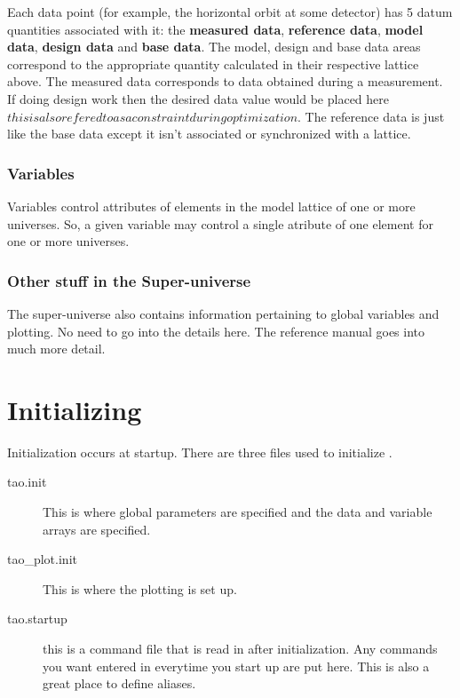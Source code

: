 \documentclass{report}
\begin{document}
Each data point (for example, the horizontal orbit at some detector) has 5 datum
 quantities associated with it: the \textbf{measured data}, \textbf{reference
data}, \textbf{model data}, \textbf{design data} and \textbf{base data}. The
model, design and base data areas correspond to the appropriate quantity
calculated in their respective lattice above. The measured data corresponds to 
data obtained during a measurement. If doing design work then the desired data
value would be placed here \( this is also refered to as a constraint during
optimization\). The reference data is just like the base data except it isn't
associated or synchronized with a lattice.

\subsection{Variables}

Variables control attributes of elements in the model lattice of one or more
universes. So, a given variable may control a single atribute of one element
for one or more universes. 

\subsection{Other stuff in the Super-universe}

The super-universe also contains information pertaining to global variables and
plotting. No need to go into the details here. The \tao reference manual goes
into much more detail.

\chapter{Initializing \tao}
\label{c:initializing}

Initialization occurs at startup. There are three files used to initialize \tao.
  \vspace*{-3ex}
\begin{description}
  \item[tao.init] \Newline 
    This is where global parameters are specified and the data and variable
arrays are specified.
  \item[tao\_plot.init] \Newline
    This is where the plotting is set up.
  \item[tao.startup] \Newline
    this is a command file that is read in after initialization. Any commands you
want entered in \tao everytime you start up are put here. This is also a great
place to define aliases.
\end{description}
\end{document}
